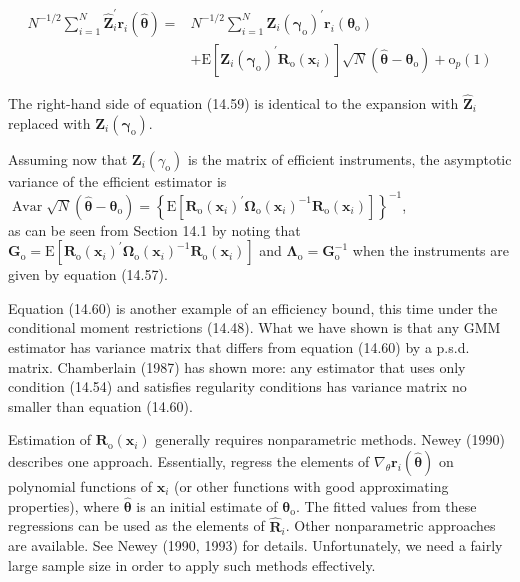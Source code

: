 \documentclass[10pt]{article}
\begin{document}
\begin{align*}
N^{-1 / 2} \sum_{i=1}^{N} \hat{\mathbf{Z}}_{i}^{\prime} \mathbf{r}_{i}(\hat{\boldsymbol{\theta}})= & N^{-1 / 2} \sum_{i=1}^{N} \mathbf{Z}_{i}\left(\boldsymbol{\gamma}_{\mathrm{o}}\right)^{\prime} \mathbf{r}_{i}\left(\boldsymbol{\theta}_{\mathrm{o}}\right) \\
& +\mathrm{E}\left[\mathbf{Z}_{i}\left(\boldsymbol{\gamma}_{\mathrm{o}}\right)^{\prime} \mathbf{R}_{\mathrm{o}}\left(\mathbf{x}_{i}\right)\right] \sqrt{N}\left(\hat{\boldsymbol{\theta}}-\boldsymbol{\theta}_{\mathrm{o}}\right)+\mathrm{o}_{p}(1) \tag{14.59}
\end{align*}


The right-hand side of equation (14.59) is identical to the expansion with $\hat{\mathbf{Z}}_{i}$ replaced with $\mathbf{Z}_{i}\left(\boldsymbol{\gamma}_{\mathrm{o}}\right)$.

Assuming now that $\mathbf{Z}_{i}\left(\gamma_{\mathrm{o}}\right)$ is the matrix of efficient instruments, the asymptotic variance of the efficient estimator is\\
$\operatorname{Avar} \sqrt{N}\left(\hat{\boldsymbol{\theta}}-\boldsymbol{\theta}_{\mathrm{o}}\right)=\left\{\mathrm{E}\left[\mathbf{R}_{\mathrm{o}}\left(\mathbf{x}_{i}\right)^{\prime} \boldsymbol{\Omega}_{\mathrm{o}}\left(\mathbf{x}_{i}\right)^{-1} \mathbf{R}_{\mathrm{o}}\left(\mathbf{x}_{i}\right)\right]\right\}^{-1}$,\\
as can be seen from Section 14.1 by noting that $\mathbf{G}_{\mathrm{o}}=\mathrm{E}\left[\mathbf{R}_{\mathrm{o}}\left(\mathbf{x}_{i}\right)^{\prime} \boldsymbol{\Omega}_{\mathrm{o}}\left(\mathbf{x}_{i}\right)^{-1} \mathbf{R}_{\mathrm{o}}\left(\mathbf{x}_{i}\right)\right]$ and $\boldsymbol{\Lambda}_{\mathrm{o}}=\mathbf{G}_{\mathrm{o}}^{-1}$ when the instruments are given by equation (14.57).

Equation (14.60) is another example of an efficiency bound, this time under the conditional moment restrictions (14.48). What we have shown is that any GMM estimator has variance matrix that differs from equation (14.60) by a p.s.d. matrix. Chamberlain (1987) has shown more: any estimator that uses only condition (14.54) and satisfies regularity conditions has variance matrix no smaller than equation (14.60).

Estimation of $\mathbf{R}_{\mathrm{o}}\left(\mathbf{x}_{i}\right)$ generally requires nonparametric methods. Newey (1990) describes one approach. Essentially, regress the elements of $\nabla_{\theta} \mathbf{r}_{i}(\hat{\boldsymbol{\theta}})$ on polynomial functions of $\mathbf{x}_{i}$ (or other functions with good approximating properties), where $\hat{\boldsymbol{\theta}}$ is an initial estimate of $\boldsymbol{\theta}_{\mathrm{o}}$. The fitted values from these regressions can be used as the elements of $\hat{\mathbf{R}}_{i}$. Other nonparametric approaches are available. See Newey (1990, 1993) for details. Unfortunately, we need a fairly large sample size in order to apply such methods effectively.
\end{document}
